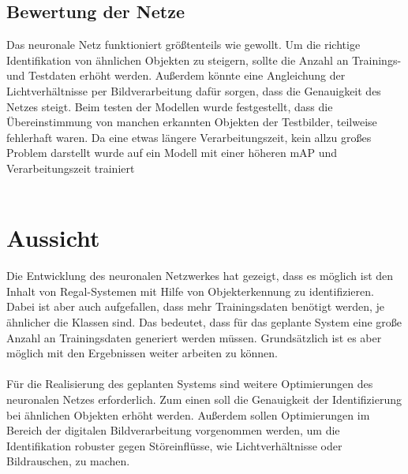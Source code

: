 \documentclass[a4paper,12pt,oneside]{article}
\begin{document}
\subsection{Bewertung der Netze}
Das neuronale Netz funktioniert größtenteils wie gewollt. Um die richtige Identifikation von ähnlichen Objekten zu steigern, sollte die Anzahl an Trainings- und Testdaten erhöht werden. Außerdem könnte eine Angleichung der Lichtverhältnisse per Bildverarbeitung dafür sorgen, dass die Genauigkeit des Netzes steigt. Beim testen der Modellen wurde festgestellt, dass die Übereinstimmung von manchen erkannten Objekten der Testbilder, teilweise fehlerhaft waren. Da eine etwas längere Verarbeitungszeit, kein allzu großes Problem darstellt wurde auf ein Modell mit einer höheren mAP und Verarbeitungszeit trainiert\\
\\

\newpage

\section{Aussicht}
Die Entwicklung des neuronalen Netzwerkes hat gezeigt, dass es möglich ist den Inhalt von Regal-Systemen mit Hilfe von Objekterkennung zu identifizieren. Dabei ist aber auch aufgefallen, dass mehr Trainingsdaten benötigt werden, je ähnlicher die Klassen sind. Das bedeutet, dass für das geplante System eine große Anzahl an Trainingsdaten generiert werden müssen. Grundsätzlich ist es aber möglich mit den Ergebnissen weiter arbeiten zu können.\\
\\
Für die Realisierung des geplanten Systems sind weitere Optimierungen des neuronalen Netzes erforderlich. Zum einen soll die Genauigkeit der Identifizierung bei ähnlichen Objekten erhöht werden. Außerdem sollen Optimierungen im Bereich der digitalen Bildverarbeitung vorgenommen werden, um die Identifikation robuster gegen Störeinflüsse, wie Lichtverhältnisse oder Bildrauschen, zu machen. 
\\

\newpage

\printbibliography
  
\end{document}
